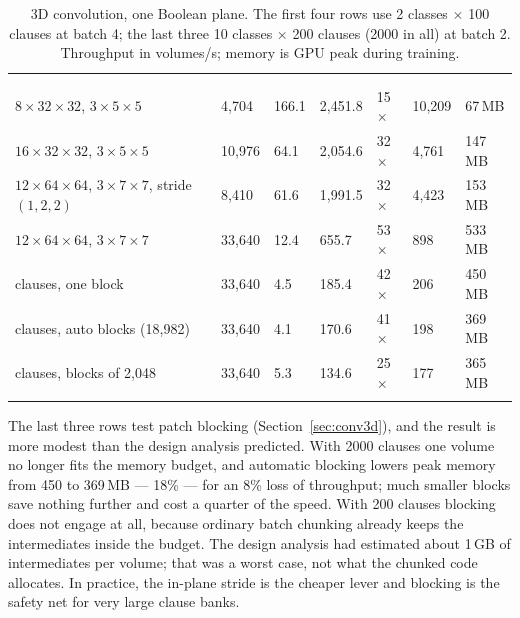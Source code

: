 \begin{table}[htbp]
\centering
\small\sffamily\sloppy
\caption{3D convolution, one Boolean plane. The first four rows use 2 classes $\times$ 100
  clauses at batch 4; the last three 10 classes $\times$ 200 clauses (2000 in all) at batch 2.
  Throughput in volumes/s; memory is GPU peak during training.}
\label{tab:conv3d}
\begin{tabularx}{\linewidth}{@{}>{\raggedright\arraybackslash}X R{1.3cm}R{1.05cm}R{1.3cm}R{1.4cm}R{1.45cm}R{1.3cm}@{}}
\ttoprule
& &  &  & \\
 &  &  &  &  &  & \\
\ttmidrule
$8\times32\times32$, $3\times5\times5$   & 4{,}704  & 166.1 & 2{,}451.8 & 15$\times$ & 10{,}209 & 67\,MB\\
$16\times32\times32$, $3\times5\times5$  & 10{,}976 & 64.1  & 2{,}054.6 & 32$\times$ & 4{,}761 & 147\,MB\\
$12\times64\times64$, $3\times7\times7$, stride $(1,2,2)$ & 8{,}410 & 61.6 & 1{,}991.5 & 32$\times$ & 4{,}423 & 153\,MB\\
$12\times64\times64$, $3\times7\times7$  & 33{,}640 & 12.4 & 655.7 & 53$\times$ & 898 & 533\,MB\\
\ttmidrule
{} clauses, one block              & 33{,}640 & 4.5 & 185.4 & 42$\times$ & 206 & 450\,MB\\
 clauses, auto blocks (18{,}982)& 33{,}640 & 4.1 & 170.6 & 41$\times$ & 198 & 369\,MB\\
 clauses, blocks of 2{,}048      & 33{,}640 & 5.3 & 134.6 & 25$\times$ & 177 & 365\,MB\\
\ttbotrule
\end{tabularx}
\end{table}

The last three rows test patch blocking (Section~\ref{sec:conv3d}), and the result is more
modest than the design analysis predicted. With 2000 clauses one volume no longer fits the
memory budget, and automatic blocking lowers peak memory from 450 to 369\,MB --- 18\% --- for
an 8\% loss of throughput; much smaller blocks save nothing further and cost a quarter of the
speed. With 200 clauses blocking does not engage at all, because ordinary batch chunking
already keeps the intermediates inside the budget. The design analysis had estimated about
1\,GB of intermediates per volume; that was a worst case, not what the chunked code
allocates. In practice, the in-plane stride is the cheaper
lever and blocking is the safety net for very large clause banks.

